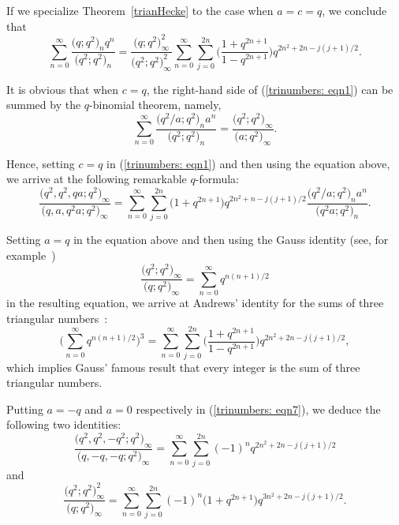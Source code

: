 \documentclass[10pt,a4paper]{amsart}
\numberwithin{equation}{section}
\begin{document}
If we specialize Theorem~\ref{trianHecke} to the case when $a=c=q$, we conclude that
\begin{equation*}%
\sum_{n=0}^\infty \frac{\bigl(q; q^2\bigr)_n q^n}{\bigl(q^2; q^2\bigr)_n}
=\frac{\bigl(q; q^2\bigr)^2_\infty}{\bigl(q^2; q^2\bigr)^2_\infty}
\sum_{n=0}^\infty \sum_{j=0}^{2n} \biggl(\frac{1+q^{2n+1}}{1-q^{2n+1}}\biggr)
q^{2n^2+2n-j(j+1)/2}.
\end{equation*}

It is obvious that when $c=q$, the right-hand side of (\ref{trinumbers: eqn1}) can be summed by the $q$-binomial theorem, namely,
\begin{equation*}%
	\sum_{n=0}^\infty \frac{\bigl(q^2/a; q^2\bigr)_n a^n}{\bigl(q^2; q^2\bigr)_n}
	=\frac{\bigl(q^2; q^2\bigr)_\infty}{\bigl(a; q^2\bigr)_\infty}.
\end{equation*}

Hence, setting $c=q$ in (\ref{trinumbers: eqn1}) and then using the equation above, we arrive at the following remarkable $q$-formula:
\begin{equation}\label{trinumbers: eqn7}
\frac{\bigl(q^2, q^2, qa; q^2\bigr)_\infty}{\bigl(q, a, q^2a; q^2\bigr)_\infty}
=\sum_{n=0}^\infty \sum_{j=0}^{2n} \bigl(1+q^{2n+1}\bigr) q^{2n^2+n-j(j+1)/2}
\frac{\bigl(q^2/a; q^2\bigr)_n a^n}{\bigl(q^2a; q^2\bigr)_n}.
\end{equation}

Setting $a=q$ in the equation above and then using the Gauss identity
(see, for example~\mbox{\cite[p.~347]{Liu2010pacific})}
\[
\frac{\bigl(q^2; q^2\bigr)_\infty}{\bigl(q; q^2\bigr)_\infty}=\sum_{n=0}^\infty q^{n(n+1)/2}
\]
in the resulting equation, we arrive at Andrews' identity for the sums of three triangular num\-bers~\cite[equation~(1.5)]{Andrews86}:
\begin{equation}\label{trinumbers:eqn8}
\Biggl(\sum_{n=0}^\infty q^{n(n+1)/2}\Biggr)^3
=\sum_{n=0}^\infty \sum_{j=0}^{2n} \biggl(\frac{1+q^{2n+1}}{1-q^{2n+1}}\biggr) q^{2n^2+2n-j(j+1)/2},
\end{equation}
which implies Gauss' famous result that every integer is the sum of three triangular numbers.

Putting $a=-q$ and $a=0$ respectively in (\ref{trinumbers: eqn7}), we deduce the following two identities:
\begin{equation*}%
\frac{\bigl(q^2, q^2, -q^2; q^2\bigr)_\infty}{\bigl(q, -q, -q; q^2\bigr)_\infty}
=\sum_{n=0}^\infty \sum_{j=0}^{2n} (-1)^n q^{2n^2+2n-j(j+1)/2}
\end{equation*}
and
\begin{equation*}%
\frac{\bigl(q^2; q^2\bigr)^2_\infty}{\bigl(q; q^2\bigr)_\infty}
=\sum_{n=0}^\infty \sum_{j=0}^{2n} (-1)^n \bigl(1+q^{2n+1}\bigr) q^{3n^2+2n-j(j+1)/2}.
\end{equation*}
\end{document}
